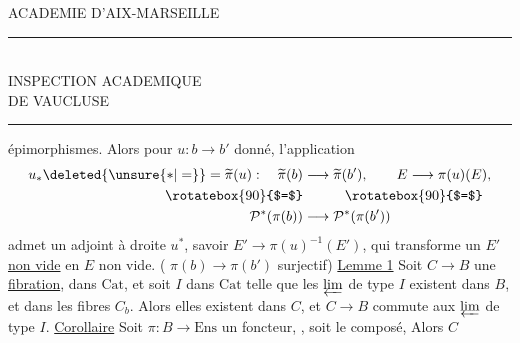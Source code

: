 \begin{center}
ACADEMIE D'AIX-MARSEILLE\\
\rule{4em}{0.4pt}\\
INSPECTION ACADEMIQUE\\
DE VAUCLUSE\\
\rule{1.6em}{0.4pt}
\end{center}
épimorphismes. Alors  pour $u:b\longrightarrow b'$ donné, l'application
\[
\begin{aligned}
 u_*\deleted{\unsure{*|=}}=\widetilde\pi(u):\quad\widetilde\pi(b)&\longrightarrow\widetilde\pi(b'),\qquad E\longrightarrow\pi(u)(E),\\
 \rotatebox{90}{$=$}&\hspace{3em}\rotatebox{90}{$=$}\\
 \mathcal P^*(\pi(b))&\longrightarrow\mathcal P^*(\pi(b'))
\end{aligned}
\]
admet un adjoint à droite  $u^*$, savoir $E'\longrightarrow\pi(u)^{-1}(E')$, qui transforme un $E'$ \uline{non vide} en $E$ non vide. ( $\pi(b)\longrightarrow\pi(b')$ surjectif)
\uline{Lemme 1} Soit $C\longrightarrow B$ une \uline{fibration}, dans $\mathrm{Cat}$, et  soit $I$ dans $\mathrm{Cat}$ telle que les $\varprojlim$ de type $I$ existent dans $B$, et dans les fibres $C_b$. Alors elles existent dans $C$, et $C\longrightarrow B$ commute aux $\varprojlim$ de type $I$.
\uline{Corollaire} Soit $\pi:B\longrightarrow\mathrm{Ens}$ un foncteur, , soit
le composé,  Alors $C$
